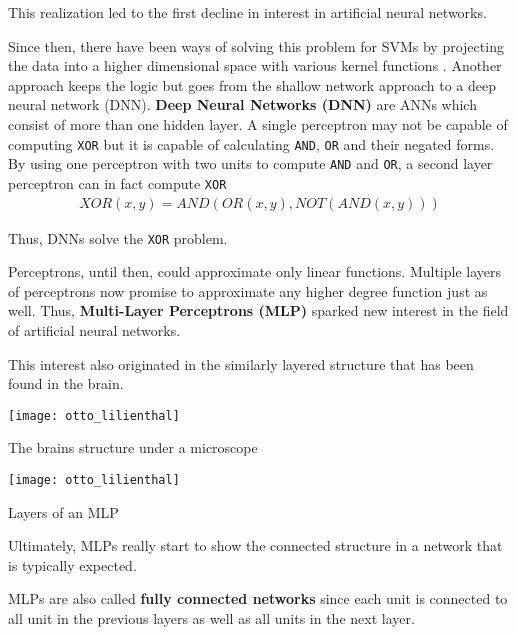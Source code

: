 This realization led to the first decline in interest in artificial neural networks.

Since then, there have been ways of solving this problem for SVMs by projecting the data into a higher dimensional space with various kernel functions \cite{ommer}.
Another approach keeps the logic but goes from the shallow network approach to a deep neural network (DNN).
\textbf{Deep Neural Networks (DNN)} are ANNs which consist of more than one hidden layer.
A single perceptron may not be capable of computing \lstinline|XOR| but it is capable of calculating \lstinline|AND|, \lstinline|OR| and their negated forms.
By using one perceptron with two units to compute \lstinline|AND| and \lstinline|OR|, a second layer perceptron can in fact compute \lstinline|XOR|
\begin{align}
    XOR(x, y) = AND(OR(x, y), NOT(AND(x, y)))
\end{align}

Thus, DNNs solve the \lstinline|XOR| problem.


Perceptrons, until then, could approximate only linear functions.
Multiple layers of perceptrons now promise to approximate any higher degree function just as well.
Thus, \textbf{Multi-Layer Perceptrons (MLP)} sparked new interest in the field of artificial neural networks.

This interest also originated in the similarly layered structure that has been found in the brain.
\begin{marginfigure}
    \texttt{[image: otto\_lilienthal]}
    \caption[]{The brains structure under a microscope}
\end{marginfigure}
\begin{marginfigure}
    \texttt{[image: otto\_lilienthal]}
    \caption[]{Layers of an MLP}
\end{marginfigure}
Ultimately, MLPs really start to show the connected structure in a network that is typically expected.

MLPs are also called \textbf{fully connected networks} since each unit is connected to all unit in the previous layers as well as all units in the next layer.



